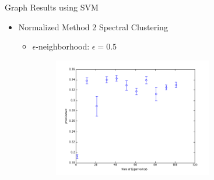 \documentclass[xcolor=dvipsnames,t]{beamer} %
\begin{document}
\begin{frame}{Graph Results using SVM}
\begin{itemize}
\item Normalized Method 2 Spectral Clustering 
\begin{itemize}
\item $\epsilon$-neighborhood: $\epsilon = 0.5$
\begin{figure}[h!]
\centering
  \centering
    \includegraphics[width=0.7\textwidth]{figures/plotopt1n2.png}
\end{figure}
\end{itemize}
\end{itemize}

\end{frame}
\end{document}
